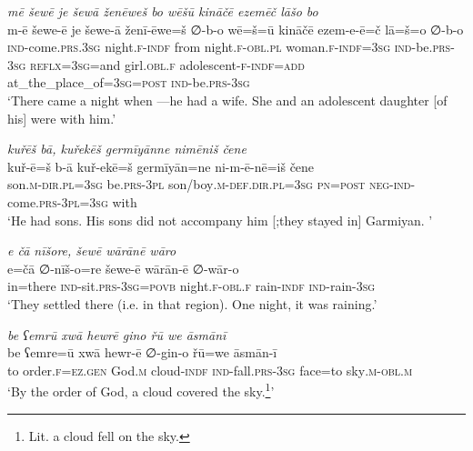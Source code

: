 \ea \label{ZB.8}
\textit{mē šewē je šewā ženēweš bo wēšū kināčē ezemēč lāšo bo} \\ 
\gll m-ē šewe-ē je šewe-ā ženī-ēwe=š ∅-b-o wē=š=ū kināčē ezem-e-ē=č lā=š=o ∅-b-o \\ 
 \textsc{ind-}come\textsc{.prs}\textsc{.3sg} night\textsc{.f}\textsc{-indf} from night\textsc{.f}\textsc{-obl}\textsc{.pl} woman\textsc{.f}\textsc{-indf}\textsc{=3sg} \textsc{ind-}be\textsc{.prs}\textsc{-3sg} \textsc{reflx}\textsc{=3sg}=and girl\textsc{.obl}\textsc{.f} adolescent\textsc{-f}\textsc{-indf}\textsc{=add} at\_the\_place\_of\textsc{=3sg}\textsc{=\textsc{post}} \textsc{ind-}be\textsc{.prs}\textsc{-3sg} \\ 
\glt `There came a night when —he had a wife. She and an adolescent daughter [of his] were with him.'
\z 
 
\ea \label{ZB.9}
\textit{kuřēš bā, kuřekēš germīyānne nimēniš čene} \\ 
\gll kuř-ē=š b-ā kuř-ekē=š germīyān=ne ni-m-ē-nē=iš čene \\ 
 son\textsc{.m}\textsc{-dir}\textsc{.pl}\textsc{=3sg} be\textsc{.prs}\textsc{-3pl} son/boy\textsc{.m}\textsc{-def}\textsc{.dir}\textsc{.pl}\textsc{=3sg} \textsc{pn}\textsc{=\textsc{post}} \textsc{neg-}\textsc{ind-}come\textsc{.prs}\textsc{-3pl}\textsc{=3sg} with \\ 
\glt `He had sons. His sons did not accompany him [;they stayed in] Garmiyan. '
\z 
 
\ea \label{ZB.10}
\textit{e čā nīšore, šewē wārānē wāro} \\ 
\gll e=čā ∅-nīš-o=re šewe-ē wārān-ē ∅-wār-o \\ 
 in=there \textsc{ind-}sit\textsc{.prs}\textsc{-3sg}\textsc{=\textsc{povb}} night\textsc{.f}\textsc{-obl}\textsc{.f} rain\textsc{-indf} \textsc{ind-}rain\textsc{-3sg} \\ 
\glt `They settled there (i.e. in that region). One night, it was raining.'
\z 
 
\ea \label{ZB.11}
\textit{be ʕemrū xwā hewrē gino řū we āsmānī} \\ 
\gll be ʕemre=ū xwā hewr-ē ∅-gin-o řū=we āsmān-ī \\ 
 to order\textsc{.f}\textsc{\textsc{=ez.gen}} God\textsc{.m} cloud\textsc{-indf} \textsc{ind-}fall\textsc{.prs}\textsc{-3sg} face=to sky\textsc{.m}\textsc{-obl}\textsc{.m} \\ 
\glt `By the order of God, a cloud covered the sky.\footnote{Lit. a cloud fell on the sky.}'
\z 
 
